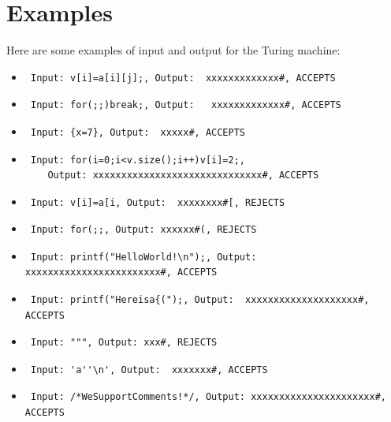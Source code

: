 \documentclass{article}
\begin{document}
\section{Examples}
Here are some examples of input and output for the Turing machine:
\begin{itemize}
    \item \begin{verbatim} Input: v[i]=a[i][j];, Output:  xxxxxxxxxxxxx#, ACCEPTS \end{verbatim}
    \item \begin{verbatim} Input: for(;;)break;, Output:   xxxxxxxxxxxxx#, ACCEPTS \end{verbatim}
    \item \begin{verbatim} Input: {x=7}, Output:  xxxxx#, ACCEPTS \end{verbatim}
    \item \begin{verbatim} Input: for(i=0;i<v.size();i++)v[i]=2;, 
    Output: xxxxxxxxxxxxxxxxxxxxxxxxxxxxxx#, ACCEPTS \end{verbatim}
    \item \begin{verbatim} Input: v[i]=a[i, Output:  xxxxxxxx#[, REJECTS \end{verbatim}
    \item \begin{verbatim} Input: for(;;, Output: xxxxxx#(, REJECTS \end{verbatim}
    \item \begin{verbatim} Input: printf("HelloWorld!\n");, Output: xxxxxxxxxxxxxxxxxxxxxxxx#, ACCEPTS \end{verbatim}
    \item \begin{verbatim} Input: printf("Hereisa{(");, Output:  xxxxxxxxxxxxxxxxxxxx#, ACCEPTS \end{verbatim}
    \item \begin{verbatim} Input: """, Output: xxx#, REJECTS \end{verbatim}
    \item \begin{verbatim} Input: 'a''\n', Output:  xxxxxxx#, ACCEPTS \end{verbatim}
    \item \begin{verbatim} Input: /*WeSupportComments!*/, Output: xxxxxxxxxxxxxxxxxxxxxx#, ACCEPTS \end{verbatim}

\end{itemize}
\end{document}
